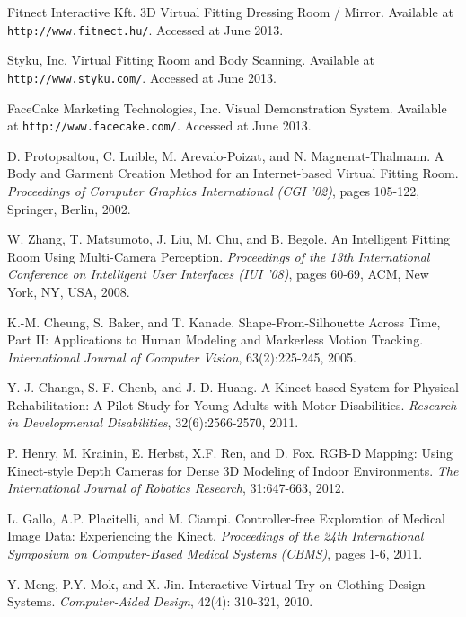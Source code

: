 \documentclass[number,preprint,review,12pt]{elsarticle}
\begin{document}
\begin{thebibliography}{}
Fitnect Interactive Kft. 3D Virtual Fitting Dressing Room / Mirror. Available at \verb+http://www.fitnect.hu/+. Accessed at June 2013.

Styku, Inc. Virtual Fitting Room and Body Scanning. Available at \verb+http://www.styku.com/+. Accessed at June 2013.

FaceCake Marketing Technologies, Inc. Visual Demonstration System. Available at \verb+http://www.facecake.com/+. Accessed at June 2013.

D. Protopsaltou, C. Luible, M. Arevalo-Poizat, and N. Magnenat-Thalmann. A Body and Garment Creation Method for an Internet-based Virtual Fitting Room. \textit{Proceedings of Computer Graphics International (CGI '02)}, pages 105-122, Springer, Berlin, 2002.

W. Zhang, T. Matsumoto, J. Liu, M. Chu, and B. Begole. An Intelligent Fitting Room Using Multi-Camera Perception. \textit{Proceedings of the 13th International Conference on Intelligent User Interfaces (IUI '08)}, pages 60-69, ACM, New York, NY, USA, 2008.

K.-M. Cheung, S. Baker, and T. Kanade. Shape-From-Silhouette Across Time, Part II: Applications to Human Modeling and Markerless Motion Tracking. \textit{International Journal of Computer Vision}, 63(2):225-245, 2005.

Y.-J. Changa, S.-F. Chenb, and J.-D. Huang. A Kinect-based System for Physical Rehabilitation: A Pilot Study for Young Adults with Motor Disabilities. \textit{Research in Developmental Disabilities}, 32(6):2566-2570, 2011.

P. Henry, M. Krainin, E. Herbst, X.F. Ren, and D. Fox. RGB-D Mapping: Using Kinect-style Depth Cameras for Dense 3D Modeling of Indoor Environments. \textit{The International Journal of Robotics Research}, 31:647-663, 2012.

L. Gallo, A.P. Placitelli, and M. Ciampi. Controller-free Exploration of Medical Image Data: Experiencing the Kinect. 
\textit{Proceedings of the 24th International Symposium on Computer-Based Medical Systems (CBMS)}, pages 1-6, 2011.

Y. Meng, P.Y. Mok, and X. Jin. Interactive Virtual Try-on Clothing Design Systems. \textit{Computer-Aided Design}, 42(4): 310-321, 2010.


\end{thebibliography}
\end{document}
